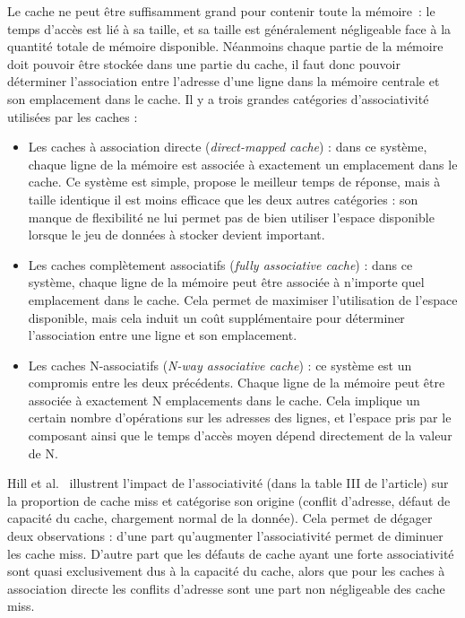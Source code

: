 Le cache ne peut être suffisamment grand pour contenir toute la mémoire~: le temps d'accès est lié à sa taille, et sa taille est généralement négligeable face à la quantité totale de mémoire disponible.
Néanmoins chaque partie de la mémoire doit pouvoir être stockée dans une partie du cache, il faut donc pouvoir déterminer l'association entre l'adresse d'une ligne dans la mémoire centrale et son emplacement dans le cache.
Il y a trois grandes catégories d'associativité utilisées par les caches :
\begin{itemize}
  \item Les caches à association directe (\emph{direct-mapped cache}) : dans ce système, chaque ligne de la mémoire est associée à exactement un emplacement dans le cache.
    Ce système est simple, propose le meilleur temps de réponse, mais à taille identique il est moins efficace que les deux autres catégories : son manque de flexibilité ne lui permet pas de bien utiliser l'espace disponible lorsque le jeu de données à stocker devient important.
  \item Les caches complètement associatifs (\emph{fully associative cache}) : dans ce système, chaque ligne de la mémoire peut être associée à n'importe quel emplacement dans le cache.
    Cela permet de maximiser l'utilisation de l'espace disponible, mais cela induit un coût supplémentaire pour déterminer l'association entre une ligne et son emplacement.
  \item Les caches N-associatifs (\emph{N-way associative cache}) : ce système est un compromis entre les deux précédents.
    Chaque ligne de la mémoire peut être associée à exactement N emplacements dans le cache.
    Cela implique un certain nombre d'opérations sur les adresses des lignes, et l'espace pris par le composant ainsi que le temps d'accès moyen dépend directement de la valeur de N.
\end{itemize}

Hill et al.~\cite{Hill1989} illustrent l'impact de l'associativité (dans la table III de l'article) sur la proportion de cache miss et catégorise son origine (conflit d'adresse, défaut de capacité du cache, chargement normal de la donnée).
Cela permet de dégager deux observations : d'une part qu'augmenter l'associativité permet de diminuer les cache miss.
D'autre part que les défauts de cache ayant une forte associativité sont quasi exclusivement dus à la capacité du cache, alors que pour les caches à association directe les conflits d'adresse sont une part non négligeable des cache miss.

